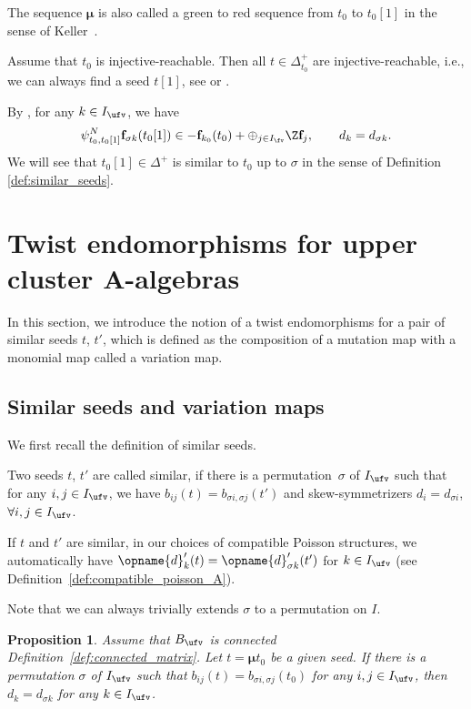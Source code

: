 \documentclass[pdftex]{sigma}
\newcommand{\Iufv}{I_{\ufv}}
\newcommand{\Ifv}{I_{\fv}}
\renewcommand{\diag}{\opname{d}'}
\newcommand{\seq}{\boldsymbol{\mu}}%
\newcommand{\ff}{\mathbf{f}}
\numberwithin{equation}{section}
\newtheorem{Proposition}[Theorem]{Proposition}
 { \theoremstyle{definition}
\newtheorem{Definition}[Theorem]{Definition}
\newtheorem{Note}[Theorem]{Note}
\newtheorem{Example}[Theorem]{Example}
\newtheorem{Remark}[Theorem]{Remark}
\newtheorem{Assumption}[Theorem]{Assumption}
}
\begin{document}
The sequence $\seq$ is also called a green to red sequence from $t_{0}$
to $t_{0}[1]$ in the sense of Keller~\cite{keller2011cluster}.

Assume that $t_{0}$ is injective-reachable. Then all $t\in\Delta_{t_{0}}^{+}$
are injective-reachable, i.e., we can always find a seed $t[1]$, see
\cite[Proposition~5.1.4]{qin2017triangular} or \cite{muller2015existence}.

By \cite[Proposition~2.3.3]{qin2017triangular}, for any $k\in\Iufv$,
we have \[\psi_{t_{0},t_{0}[1]}^{N}\ff_{\sigma k}(t_{0}[1])\in-\ff_{k_{0}}(t_{0})+\oplus_{j\in\Ifv}\Z\ff_{j},\qquad d_{k}=d_{\sigma k}.\]
 We will see that $t_{0}[1]\in\Delta^{+}$ is similar
to $t_{0}$ up to $\sigma$ in the sense of Definition \ref{def:similar_seeds}.

\section[Twist endomorphisms for upper cluster A-algebras]{Twist endomorphisms for upper cluster $\boldsymbol{A}$-algebras}\label{sec:Twist-endomorphisms-A}

In this section, we introduce the notion of a twist endomorphisms
for a pair of similar seeds $t$, $t'$, which is defined as the composition
of a mutation map with a monomial map called a variation map.

\subsection{Similar seeds and variation maps}

We first recall the definition of similar seeds.

\begin{Definition}\label{def:similar_seeds}
Two seeds $t$, $t'$ are called similar, if there is a permutation~$\sigma$ of $\Iufv$ such that for any $i,j\in\Iufv$, we have $b_{ij}(t)=b_{\sigma i,\sigma j}(t')$
and skew-symmetrizers $d_{i}=d_{\sigma i}$, $\forall i,j\in I_{\ufv}$.
\end{Definition}
If $t$ and $t'$ are similar, in our choices of compatible Poisson structures, we automatically have $\diag_{k}(t)=\diag_{\sigma k}(t')$ for $k\in\Iufv$
(see Definition~\ref{def:compatible_poisson_A}).

Note that we can always trivially extends $\sigma$ to a permutation
on $I$.

\begin{Proposition}
Assume that $B_{\ufv}$ is connected Definition~{\rm \ref{def:connected_matrix}}.
Let $t=\seq t_{0}$ be a given seed. If there is a permutation $\sigma$
of $\Iufv$ such that $b_{ij}(t)=b_{\sigma i,\sigma j}(t_0)$ for any
$i,j\in\Iufv$, then $d_{k}=d_{\sigma k}$ for any $k\in\Iufv$.
\end{Proposition}
\end{document}
